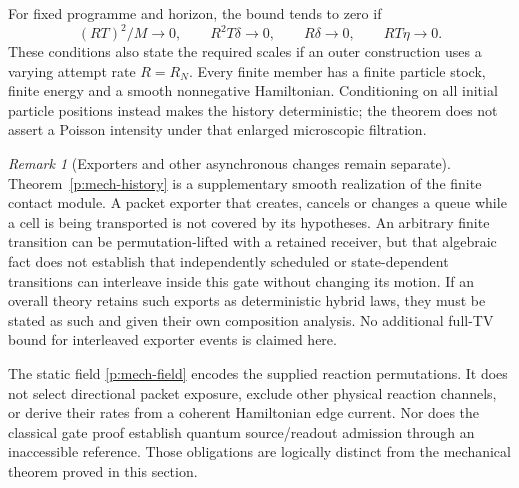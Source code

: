 \documentclass[11pt,oneside,openany]{book}
\theoremstyle{definition}
\theoremstyle{remark}\newtheorem{remark}[theorem]{Remark}
\begin{document}
For fixed programme and horizon, the bound tends to zero if
\[
 (RT)^2/M\to0,\qquad
 R^2T\delta\to0,\qquad R\delta\to0,\qquad RT\eta\to0.
\]
These conditions also state the required scales if an outer construction
uses a varying attempt rate $R=R_N$. Every finite member has a finite
particle stock, finite energy and a smooth nonnegative Hamiltonian.
Conditioning on all initial particle positions instead makes the history
deterministic; the theorem does not assert a Poisson intensity under that
enlarged microscopic filtration.

\begin{remark}[Exporters and other asynchronous changes remain separate]
\label{p:mech-scope}
Theorem~\ref{p:mech-history} is a supplementary smooth realization of the
finite contact module. A packet exporter that creates, cancels or changes
a queue while a cell is being transported is not covered by its hypotheses.
An arbitrary finite transition can be permutation-lifted with a retained
receiver, but that algebraic fact does not establish that independently
scheduled or state-dependent transitions can interleave inside this gate
without changing its motion. If an overall theory retains such exports
as deterministic hybrid laws, they must be stated as such and given their
own composition analysis. No additional full-TV bound for interleaved
exporter events is claimed here.

The static field \eqref{p:mech-field} encodes the supplied reaction
permutations. It does not select directional packet exposure, exclude
other physical reaction channels, or derive their rates from a coherent
Hamiltonian edge current. Nor does the classical gate proof establish
quantum source/readout admission through an inaccessible reference.
Those obligations are logically distinct from the mechanical theorem
proved in this section.
\end{remark}




\backmatter
\end{document}
